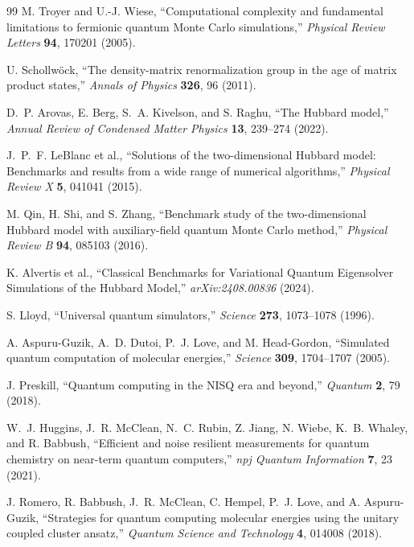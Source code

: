 \documentclass[
  reprint,
  amsmath,
  amssymb,
  aps,
  pra,
  nofootinbib,
  superscriptaddress,
  floatfix
]{revtex4-2}
\begin{document}
\begin{thebibliography}{99}
M. Troyer and U.-J. Wiese,
``Computational complexity and fundamental limitations to fermionic quantum Monte Carlo simulations,''
\emph{Physical Review Letters} \textbf{94}, 170201 (2005).

U. Schollw\"ock,
``The density-matrix renormalization group in the age of matrix product states,''
\emph{Annals of Physics} \textbf{326}, 96 (2011).

D.~P. Arovas, E. Berg, S.~A. Kivelson, and S. Raghu,
``The Hubbard model,''
\emph{Annual Review of Condensed Matter Physics} \textbf{13}, 239--274 (2022).

J.~P.~F. LeBlanc et al.,
``Solutions of the two-dimensional Hubbard model: Benchmarks and results from a wide range of numerical algorithms,''
\emph{Physical Review X} \textbf{5}, 041041 (2015).

M. Qin, H. Shi, and S. Zhang,
``Benchmark study of the two-dimensional Hubbard model with auxiliary-field quantum Monte Carlo method,''
\emph{Physical Review B} \textbf{94}, 085103 (2016).

K. Alvertis et al.,
``Classical Benchmarks for Variational Quantum Eigensolver Simulations of the Hubbard Model,''
\emph{arXiv:2408.00836} (2024).

S. Lloyd,
``Universal quantum simulators,''
\emph{Science} \textbf{273}, 1073--1078 (1996).

A. Aspuru-Guzik, A.~D. Dutoi, P.~J. Love, and M. Head-Gordon,
``Simulated quantum computation of molecular energies,''
\emph{Science} \textbf{309}, 1704--1707 (2005).

J. Preskill,
``Quantum computing in the NISQ era and beyond,''
\emph{Quantum} \textbf{2}, 79 (2018).

W.~J. Huggins, J.~R. McClean, N.~C. Rubin, Z. Jiang, N. Wiebe, K.~B. Whaley, and R. Babbush,
``Efficient and noise resilient measurements for quantum chemistry on near-term quantum computers,''
\emph{npj Quantum Information} \textbf{7}, 23 (2021).

J. Romero, R. Babbush, J.~R. McClean, C. Hempel, P.~J. Love, and A. Aspuru-Guzik,
``Strategies for quantum computing molecular energies using the unitary coupled cluster ansatz,''
\emph{Quantum Science and Technology} \textbf{4}, 014008 (2018).


\end{thebibliography}
\end{document}
